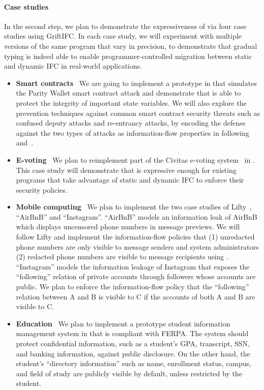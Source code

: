 \paragraph{Case studies} In the second step, we plan to demonstrate
the expressiveness of \SurfacePlus via four case studies using
GriftIFC. In each case study, we will experiment with multiple
versions of the same program that vary in precision, to demonstrate
that gradual typing is indeed able to enable programmer-controlled
migration between static and dynamic IFC in real-world applications.
\begin{itemize}
\item[] \textbf{Smart contracts}~ We are going to implement a prototype in
  \SurfacePlus that simulates the Parity Wallet smart contract attack and
  demonstrate that \SurfacePlus is able to protect the integrity of important
  state variables. We will also explore the prevention techniques against common
  smart contract security threats such as confused deputy attacks and
  re-entrancy attacks, by encoding the defense against the two types of attacks
  as information-flow properties in \SurfacePlus
  following~\textcite{cecchetti2021compositional} and~\textcite{yaoscif}.
\item[] \textbf{E-voting}~ We plan to reimplement part of the Civitas e-voting
  system~\parencite{clarkson2008civitas} in \SurfacePlus. This case study will
  demonstrate that \SurfacePlus is expressive enough for existing programs that
  take advantage of static and dynamic IFC to enforce their security policies.
\item[] \textbf{Mobile computing}~ We plan to implement the two case studies of
  Lifty~\parencite{polikarpova2020liquid}, ``AirBnB'' and ``Instagram''. ``AirBnB''
  models an information leak of AirBnB which displays uncensored phone numbers
  in message previews. We will follow Lifty and implement the information-flow
  policies that (1) unredacted phone numbers are only visible to message
  senders and system administrators (2) redacted phone numbers are
  visible to message recipients using \SurfacePlus. ``Instagram'' models the
  information leakage of Instagram that exposes the ``following'' relation of
  private accounts through followers whose accounts are public. We plan to
  enforce the information-flow policy that the ``following'' relation between A
  and B is visible to C if the accounts of both A and B are visible to C.
\item[] \textbf{Education}~ We plan to implement a prototype student information
  management system in \SurfacePlus that is compliant with FERPA. The system
  should protect confidential information, such as a student's GPA, transcript,
  SSN, and banking information, against public disclosure. On the other hand,
  the student's ``directory information'' such as name, enrollment status,
  campus, and field of study are publicly visible by default, unless restricted
  by the student.
\end{itemize}

